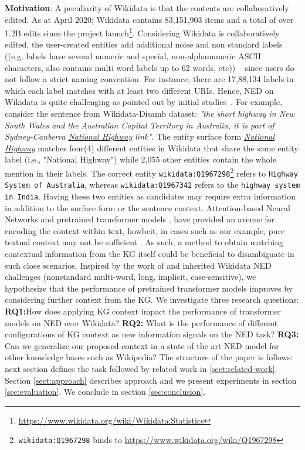 \documentclass[sigconf, superscriptaddress]{acmart}
\begin{document}
\textbf{Motivation}: A peculiarity of Wikidata is that the contents are collaboratively edited. As at April 2020; Wikidata contains 83,151,903 items and a total of over 1.2B edits since the project launch\footnote{\url{https://www.wikidata.org/wiki/Wikidata:Statistics}}. Considering Wikidata is collaboratively edited, the user-created entities add additional noise and non standard labels ((e.g. labels have several numeric and special, non-alphanumeric ASCII characters, also contains multi word labels up to 62 words, etc)) ~\cite{Mulang2019ContextawareEL} since users do not follow a strict naming convention. For instance, there are 17,88,134 labels in which each label matches with at least two different URIs. Hence, NED on Wikidata is quite challenging as pointed out by initial studies~\cite{Mulang2019ContextawareEL,sakor2019falcon}. For example, consider the sentence from Wikidata-Disamb \cite{cetoli2019neural} dataset: \textit{"the short highway in New South Wales and the Australian Capital Territory in Australia, it is part of Sydney-Canberra \textit{\underline{National Highway}} link"}. The entity surface form \textit{\underline{National Highway}} matches four(4) different entities in Wikidata that share the same entity label (i.e., "National Highway") while 2,055 other entities contain the whole mention in their labels. The correct entity \texttt{wikidata:Q1967298}\footnote{\texttt{wikidata:Q1967298} binds to  \url{https://www.wikidata.org/wiki/Q1967298}} refers to \texttt{Highway System of Australia}, whereas \texttt{wikidata:Q1967342} refers to the \texttt{highway system in India}. Having these two entities as candidates may require extra information in addition to the surface form or the sentence context. Attention-based Neural Networks \cite{Attention-DBLP:journals/corr/VaswaniSPUJGKP17} and pretrained transformer models \cite{XLNet-DBLP:journals/corr/abs-1906-08237,RoBERTa-DBLP:journals/corr/abs-1907-11692}, have provided an avenue for encoding the context within text, howbeit, in cases such as our example, pure textual context may not be sufficient \cite{Liu2019KBERTEL}. As such, a method to obtain matching contextual information from the KG itself could be beneficial to disambiguate in such close scenarios. Inspired by the work of \cite{cetoli2019neural} and inherited Wikidata NED challenges (nonstandard multi-word, long, implicit, case-sensitive), we hypothesize that the performance of pretrained transformer models improves by considering further context from the KG. We investigate three research questions: \textbf{RQ1:}How does applying KG context impact the performance of transformer models on NED over Wikidata? \textbf{RQ2:} What is the performance of different configurations of KG context as new information signals on the NED task? \textbf{RQ3:} Can we generalize our proposed context in a state of the art NED model for other knowledge bases such as Wikipedia? The structure of the paper is follows: next section defines the task followed by related work in \ref{sect:related-work}. Section \ref{sect:approach} describes approach and we present experiments in section \ref{sec:evaluation}. We conclude in section \ref{sec:conclusion}.
 
\end{document}
